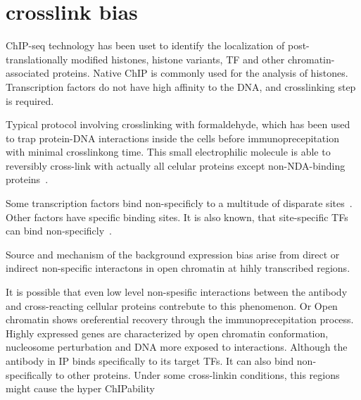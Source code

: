 \section{crosslink bias}

ChIP-seq technology has been uset to identify the localization of post-translationally modified histones, histone variants, TF and other chromatin-associated proteins.
Native ChIP is commonly used for the analysis of histones.
Transcription factors do not have high affinity to the DNA, and crosslinking step is required.

Typical protocol involving crosslinking with formaldehyde, which has been used to trap protein-DNA interactions inside the cells before immunoprecepitation with minimal crosslinkong time.
This small electrophilic molecule is able to reversibly cross-link with actually all celular proteins except non-NDA-binding proteins~\cite{solomon1985formaldehyde}. 


Some transcription factors bind non-specificly to a multitude of disparate sites~\cite{struhl2007interpreting}.
Other factors have specific binding sites.
It is also known, that site-specific TFs can bind non-specificly~\cite{hammar2012lac}\cite{mirny2009protein}.










Source and mechanism of the background expression bias arise from direct or indirect non-specific interactons in open chromatin at hihly transcribed regions.




It is possible that even low level non-spesific interactions between the antibody and cross-reacting cellular proteins contrebute to this phenomenon.
Or Open chromatin shows oreferential recovery through the immunoprecepitation process.
Highly expressed genes are characterized by open chromatin conformation, nucleosome perturbation and DNA more exposed to interactions.\cite{}
Although the antibody in IP binds specifically to its target TFs.
It can also bind non-specifically to other proteins.
Under some cross-linkin conditions, this regions might cause the hyper ChIPability\cite{}

